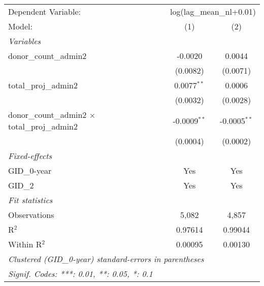 
\begingroup
\centering
\begin{tabular}{lcc}
   \tabularnewline \midrule \midrule
   Dependent Variable: & \multicolumn{2}{c}{log(lag\_mean\_nl+0.01)}\\
   Model:                                                 & (1)            & (2)\\  
   \midrule
   \emph{Variables}\\
   donor\_count\_admin2                                   & -0.0020        & 0.0044\\   
                                                          & (0.0082)       & (0.0071)\\   
   total\_proj\_admin2                                    & 0.0077$^{**}$  & 0.0006\\   
                                                          & (0.0032)       & (0.0028)\\   
   donor\_count\_admin2 $\times$ total\_proj\_admin2      & -0.0009$^{**}$ & -0.0005$^{**}$\\   
                                                          & (0.0004)       & (0.0002)\\   
   \midrule
   \emph{Fixed-effects}\\
   GID\_0-year                                            & Yes            & Yes\\  
   GID\_2                                                 & Yes            & Yes\\  
   \midrule
   \emph{Fit statistics}\\
   Observations                                           & 5,082          & 4,857\\  
   R$^2$                                                  & 0.97614        & 0.99044\\  
   Within R$^2$                                           & 0.00095        & 0.00130\\  
   \midrule \midrule
   \multicolumn{3}{l}{\emph{Clustered (GID\_0-year) standard-errors in parentheses}}\\
   \multicolumn{3}{l}{\emph{Signif. Codes: ***: 0.01, **: 0.05, *: 0.1}}\\
\end{tabular}
\par\endgroup



